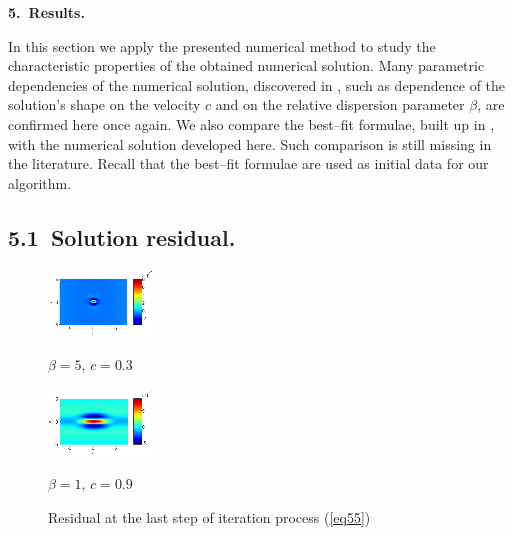 \documentclass[leqno,11pt]{book}
\newcommand{\rf}[1]{(\ref{#1})}
\newcommand{\sect}[1]{\bigskip \par {\large\bf #1}}
\begin{document}
\bigskip

\sect{5.~Results.}\label{results}

In this section we apply the presented  numerical method  to study the characteristic properties of the obtained numerical solution.  Many parametric dependencies of the numerical solution,  discovered in \cite{Ch2012,Ch2011}, such as dependence of the solution's shape on the velocity $c$ and on the relative dispersion parameter $\beta$, are confirmed here once again.
 We   also compare  the best--fit  formulae,  built up in \cite{Ch2011}, with the numerical solution  developed here. Such comparison is still missing in the literature.
Recall that the best--fit formulae   are used as initial data for our algorithm. 

\subsection{5.1~Solution residual.}

\begin{figure}[htbp]
	\begin{minipage}[b]{0.5\linewidth}
		 \centering
		\includegraphics[width=\linewidth]{residual/residual_bt5c03.eps}
		\centerline{$\beta = 5$, $c = 0.3$}
	\end{minipage}	
	\begin{minipage}[b]{0.5\linewidth}
		\centering
		 \includegraphics[width=\linewidth]{residual/residual_bt1c09.eps}
	\centerline{$\beta = 1$, $c = 0.9$ }
	\end{minipage}
		\caption{Residual at the last step of iteration process \rf{eq55} }
		\label{resid}
\end{figure}
\end{document}
